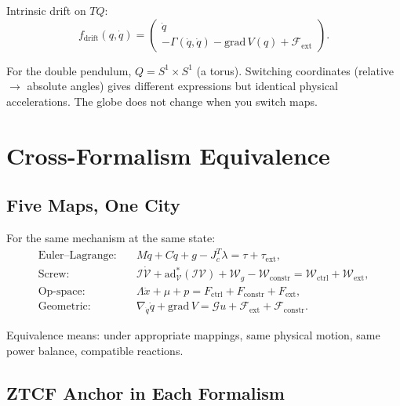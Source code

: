 \documentclass[11pt]{article}
\begin{document}
Intrinsic drift on $TQ$:
\begin{equation}\label{eq:geo-drift}
f_{\mathrm{drift}}(q,\dot{q}) = \begin{pmatrix}\dot{q}\\-\Gamma(\dot{q},\dot{q})-\mathrm{grad}\,V(q)+\mathcal{F}_{\mathrm{ext}}\end{pmatrix}.
\end{equation}

For the double pendulum, $Q = S^1\times S^1$ (a torus). Switching coordinates (relative $\to$ absolute angles) gives different expressions but identical physical accelerations. The globe does not change when you switch maps.


\section{Cross-Formalism Equivalence}\label{sec:cross-formalism}

\subsection{Five Maps, One City}

For the same mechanism at the same state:
\begin{align}
\text{Euler--Lagrange:}\quad & M\ddot{q}+C\dot{q}+g-J_c^T\lambda = \tau+\tau_{\mathrm{ext}}, \\
\text{Screw:}\quad & \mathcal{I}\dot{\mathcal{V}}+\mathrm{ad}_{\mathcal{V}}^*(\mathcal{I}\mathcal{V})+\mathcal{W}_g-\mathcal{W}_{\mathrm{constr}} = \mathcal{W}_{\mathrm{ctrl}}+\mathcal{W}_{\mathrm{ext}}, \\
\text{Op-space:}\quad & \Lambda\ddot{x}+\mu+p = F_{\mathrm{ctrl}}+F_{\mathrm{constr}}+F_{\mathrm{ext}}, \\
\text{Geometric:}\quad & \nabla_{\dot{q}}\dot{q}+\mathrm{grad}\,V = \mathcal{G}u+\mathcal{F}_{\mathrm{ext}}+\mathcal{F}_{\mathrm{constr}}.
\end{align}

Equivalence means: under appropriate mappings, same physical motion, same power balance, compatible reactions.

\subsection{ZTCF Anchor in Each Formalism}
\end{document}
